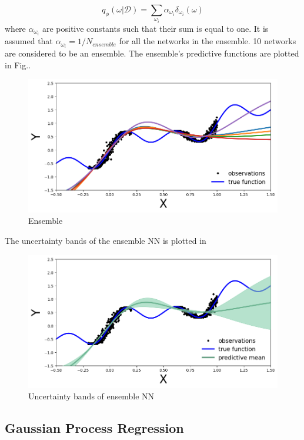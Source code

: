 \documentclass[11pt,a4paper]{article}
\begin{document}
\begin{equation}
    q_{\phi}(\omega|\mathcal{D}) = \sum_{\omega_i} \alpha_{\omega_i}\delta_{\omega_i}(\omega)
\end{equation}
where $\alpha_{\omega_i}$  are positive constants such that their sum is equal to one.
It is assumed that $\alpha_{\omega_i} = 1/N_{ensemble}$ for all the networks in the ensemble. 10 networks are considered to be an ensemble. The ensemble's predictive functions are plotted in Fig.\fbox{\ref{fig:ensemble}}.

\begin{figure}[h!]
    \centering
    \includegraphics[scale=0.5]{ensemble.png}
    \caption{Ensemble}
    \label{fig:ensemble}
\end{figure}
The uncertainty bands of the ensemble NN is plotted in \fbox{\ref{fig:ensemble uncertainty}}

\begin{figure}[h!]
    \centering
    \includegraphics[scale=0.5]{ensemble uncertainty.png}
    \caption{Uncertainty bands of ensemble NN}
    \label{fig:ensemble uncertainty}
\end{figure}


\subsection{Gaussian Process Regression}
\end{document}
